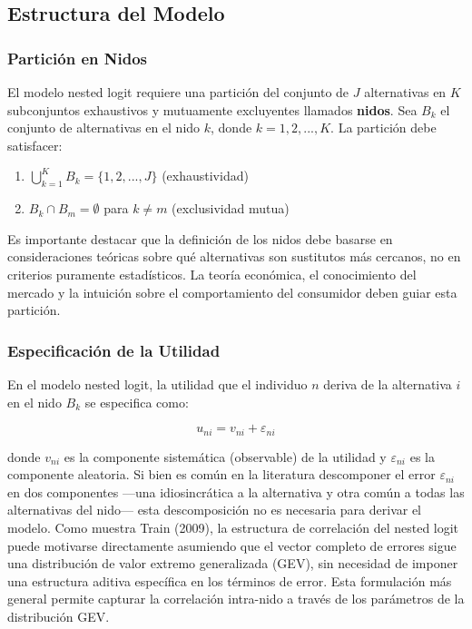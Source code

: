 \documentclass[
]{book}
\providecommand{\tightlist}{%
  \setlength{\itemsep}{0pt}\setlength{\parskip}{0pt}}
\begin{document}
\hypertarget{estructura-del-modelo}{%
\subsection{Estructura del Modelo}\label{estructura-del-modelo}}

\hypertarget{particiuxf3n-en-nidos}{%
\subsubsection{Partición en Nidos}\label{particiuxf3n-en-nidos}}

El modelo nested logit requiere una partición del conjunto de \(J\) alternativas en \(K\) subconjuntos exhaustivos y mutuamente excluyentes llamados \textbf{nidos}. Sea \(B_k\) el conjunto de alternativas en el nido \(k\), donde \(k = 1, 2, ..., K\). La partición debe satisfacer:

\begin{enumerate}
\def\labelenumi{\arabic{enumi}.}
\tightlist
\item
  \(\bigcup_{k=1}^K B_k = \{1, 2, ..., J\}\) (exhaustividad)
\item
  \(B_k \cap B_m = \emptyset\) para \(k \neq m\) (exclusividad mutua)
\end{enumerate}

Es importante destacar que la definición de los nidos debe basarse en consideraciones teóricas sobre qué alternativas son sustitutos más cercanos, no en criterios puramente estadísticos. La teoría económica, el conocimiento del mercado y la intuición sobre el comportamiento del consumidor deben guiar esta partición.

\hypertarget{especificaciuxf3n-de-la-utilidad}{%
\subsubsection{Especificación de la Utilidad}\label{especificaciuxf3n-de-la-utilidad}}

En el modelo nested logit, la utilidad que el individuo \(n\) deriva de la alternativa \(i\) en el nido \(B_k\) se especifica como:

\begin{equation}
u_{ni} = v_{ni} + \varepsilon_{ni}
\label{eq:nestedutil}
\end{equation}

donde \(v_{ni}\) es la componente sistemática (observable) de la utilidad y \(\varepsilon_{ni}\) es la componente aleatoria. Si bien es común en la literatura descomponer el error \(\varepsilon_{ni}\) en dos componentes ---una idiosincrática a la alternativa y otra común a todas las alternativas del nido--- esta descomposición no es necesaria para derivar el modelo. Como muestra Train (2009), la estructura de correlación del nested logit puede motivarse directamente asumiendo que el vector completo de errores sigue una distribución de valor extremo generalizada (GEV), sin necesidad de imponer una estructura aditiva específica en los términos de error. Esta formulación más general permite capturar la correlación intra-nido a través de los parámetros de la distribución GEV.
\end{document}

